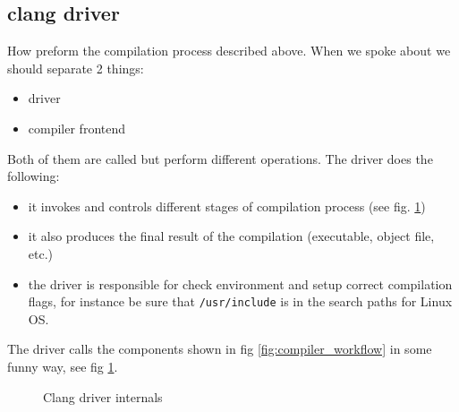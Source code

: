\subsection{clang driver}
How \clang preform the compilation process described above. When we spoke about
\clang we should separate 2 things: 
\begin{itemize}
\item driver
\item compiler frontend 
\end{itemize}
Both of them are called \clang but perform different
operations. The driver does the following:
\begin{itemize}
  \item it invokes and controls different stages of compilation process (see
    fig. \ref{fig:clang_driver})
  \item it also produces the final result of the compilation (executable,
      object file, etc.)
  \item the driver is responsible for check environment and setup correct
      compilation flags, for instance be sure that
      \texttt{/usr/include} is in the search paths for Linux OS.    
\end{itemize}

The \clang driver calls the components shown in fig \ref{fig:compiler_workflow}
in some funny way, see fig \ref{fig:clang_driver}.
\begin{figure}
  \begin{center}
  \end{center}
  \caption{Clang driver internals}
  \label{fig:clang_driver}
\end{figure}

